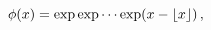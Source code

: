 \[\phi(x)=\mathop{\exp\/}\nolimits\mathop{\exp\/}\nolimits\cdots\mathop{\exp\/}%
\nolimits\!\left(x-\left\lfloor x\right\rfloor\right),\]